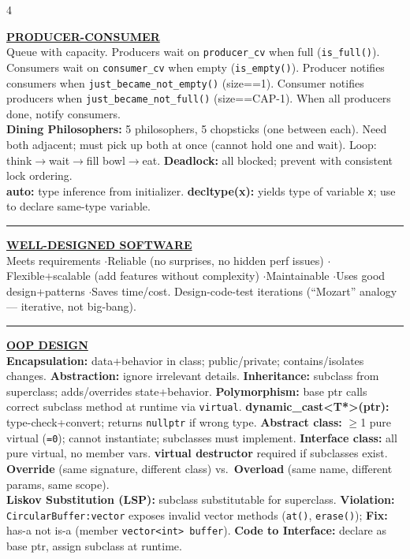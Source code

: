 \documentclass[landscape,letterpaper]{article}
\newcommand{\h}[1]{\textbf{#1}}
\newcommand{\hd}[1]{\vspace{1pt}\noindent\textbf{\underline{#1}}\vspace{-1pt}}
\begin{document}
\begin{multicols}{4}
\columnbreak

\hd{PRODUCER-CONSUMER}\\[-2pt]
Queue with capacity. Producers wait on \texttt{producer\_cv} when full (\texttt{is\_full()}). Consumers wait on \texttt{consumer\_cv} when empty (\texttt{is\_empty()}). Producer notifies consumers when \texttt{just\_became\_not\_empty()} (size==1). Consumer notifies producers when \texttt{just\_became\_not\_full()} (size==CAP-1). When all producers done, notify consumers.\\[-2pt]
\h{Dining Philosophers:} 5 philosophers, 5 chopsticks (one between each). Need both adjacent; must pick up both at once (cannot hold one and wait). Loop: think$\to$wait$\to$fill bowl$\to$eat. \h{Deadlock:} all blocked; prevent with consistent lock ordering.\\[-2pt]
\h{auto:} type inference from initializer. \h{decltype(x):} yields type of variable \texttt{x}; use to declare same-type variable.\\[-2pt]

\vspace{-1pt}\noindent\rule{\columnwidth}{0.2pt}\vspace{-3pt}

\hd{WELL-DESIGNED SOFTWARE}\\[-2pt]
Meets requirements \quad$\cdot$\quad Reliable (no surprises, no hidden perf issues) \quad$\cdot$\quad Flexible+scalable (add features without complexity) \quad$\cdot$\quad Maintainable \quad$\cdot$\quad Uses good design+patterns \quad$\cdot$\quad Saves time/cost. Design-code-test iterations (``Mozart'' analogy — iterative, not big-bang).\\[-2pt]

\vspace{-1pt}\noindent\rule{\columnwidth}{0.2pt}\vspace{-3pt}

\hd{OOP DESIGN}\\[-2pt]
\h{Encapsulation:} data+behavior in class; public/private; contains/isolates changes. \h{Abstraction:} ignore irrelevant details. \h{Inheritance:} subclass from superclass; adds/overrides state+behavior. \h{Polymorphism:} base ptr calls correct subclass method at runtime via \texttt{virtual}. \h{dynamic\_cast\textless T*\textgreater(ptr):} type-check+convert; returns \texttt{nullptr} if wrong type. \h{Abstract class:} $\geq$1 pure virtual (\texttt{=0}); cannot instantiate; subclasses must implement. \h{Interface class:} all pure virtual, no member vars. \h{virtual destructor} required if subclasses exist. \h{Override} (same signature, different class) vs.\ \h{Overload} (same name, different params, same scope).\\[-2pt]
\h{Liskov Substitution (LSP):} subclass substitutable for superclass. \h{Violation:} \texttt{CircularBuffer:vector} exposes invalid vector methods (\texttt{at()}, \texttt{erase()}); \h{Fix:} has-a not is-a (member \texttt{vector<int> buffer}). \h{Code to Interface:} declare as base ptr, assign subclass at runtime.\\[-2pt]


\end{multicols}
\end{document}
